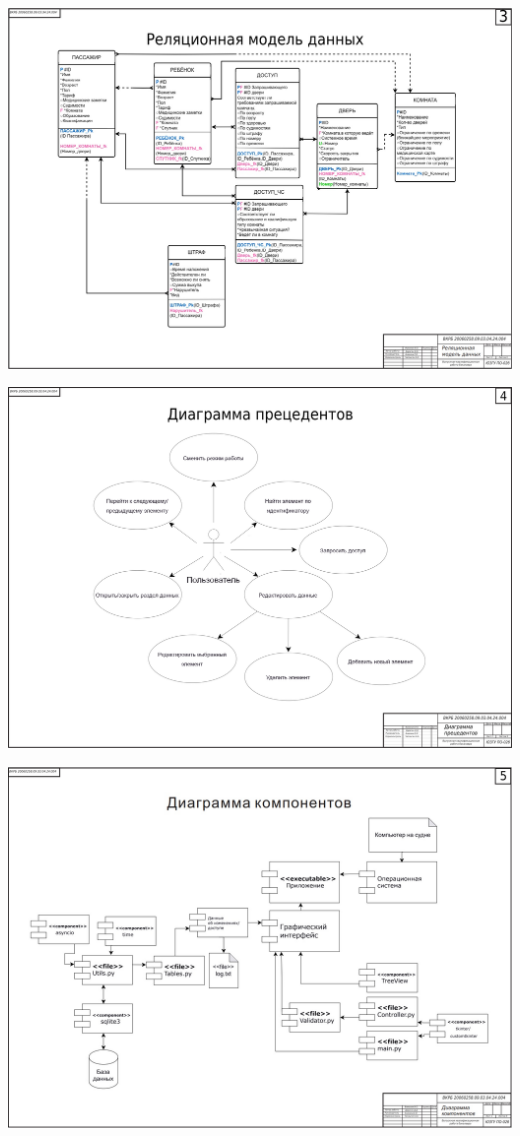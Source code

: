 \begin{landscape}
\begin{плакат}
	\includegraphics[width=0.82\linewidth]{images/плакат3.png}
	\label{fig:3}
\end{плакат}

\begin{плакат}
	\includegraphics[width=0.82\linewidth]{images/плакат4.png}
	\label{fig:4}
\end{плакат}

\begin{плакат}
	\includegraphics[width=0.82\linewidth]{images/плакат5.png}
	\label{fig:5}
\end{плакат}


\end{landscape}
